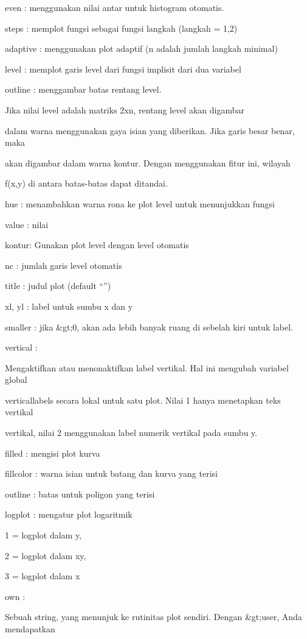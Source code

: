 \documentclass{article}
\begin{document}
even : menggunakan nilai antar untuk histogram otomatis.


steps : memplot fungsi sebagai fungsi langkah (langkah = 1,2)


adaptive : menggunakan plot adaptif (n adalah jumlah langkah minimal)


level : memplot garis level dari fungsi implisit dari dua variabel


outline : menggambar batas rentang level.


Jika nilai level adalah matriks 2xn, rentang level akan digambar


dalam warna menggunakan gaya isian yang diberikan. Jika garis besar
benar, maka


akan digambar dalam warna kontur. Dengan menggunakan fitur ini,
wilayah


f(x,y) di antara batas-batas dapat ditandai.


hue : menambahkan warna rona ke plot level untuk menunjukkan fungsi


            value : nilai


kontur: Gunakan plot level dengan level otomatis


nc : jumlah garis level otomatis


title : judul plot (default “”)


xl, yl : label untuk sumbu x dan y


smaller : jika &gt;0, akan ada lebih banyak ruang di sebelah kiri untuk
label.


vertical :


  Mengaktifkan atau menonaktifkan label vertikal. Hal ini mengubah
variabel global


  verticallabels secara lokal untuk satu plot. Nilai 1 hanya
menetapkan teks vertikal


  vertikal, nilai 2 menggunakan label numerik vertikal pada sumbu y.


filled : mengisi plot kurva


fillcolor : warna isian untuk batang dan kurva yang terisi


outline : batas untuk poligon yang terisi


logplot : mengatur plot logaritmik


            1 = logplot dalam y,


            2 = logplot dalam xy,


            3 = logplot dalam x


own :


  Sebuah string, yang menunjuk ke rutinitas plot sendiri. Dengan
&gt;user, Anda mendapatkan
\end{document}
